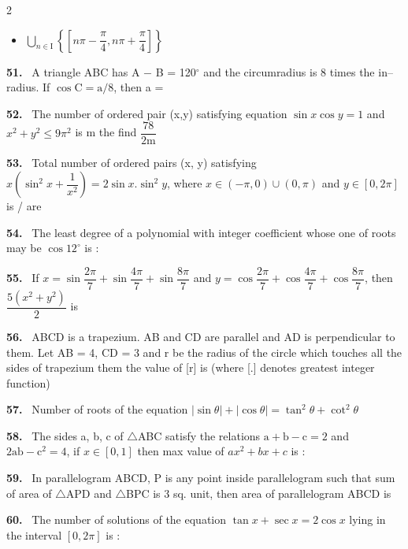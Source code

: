 \documentclass[10pt]{extarticle}
\newcommand{\qn}[1]{\par\smallskip\noindent\textbf{#1.}~}
\newenvironment{qoptions}{\begin{itemize}[leftmargin=1.8em,itemsep=1pt,topsep=2pt,label={}]}{\end{itemize}}
\newcommand{\opt}[2]{\item[(#1)] #2}
\begin{document}
\begin{multicols}{2}
\begin{qoptions}
\opt{D}{$\displaystyle\bigcup_{n\in\mathrm I}\left\{\left[n\pi-\dfrac\pi4,n\pi+\dfrac\pi4\right]\right\}$}
\end{qoptions}
\qn{51} A triangle ABC has A $-$ B = 120$^\circ$ and the circumradius is 8 times the in--radius. If $\cos\mathrm C=\mathrm a/8$, then a =
\qn{52} The number of ordered pair (x,y) satisfying equation $\sin x\cos y=1$ and $x^2+y^2\le9\pi^2$ is m the find $\dfrac{78}{2\mathrm m}$
\qn{53} Total number of ordered pairs (x, y) satisfying $x\left(\sin^2x+\dfrac1{x^2}\right)=2\sin x.\sin^2y$, where $x\in(-\pi,0)\cup(0,\pi)$ and $y\in[0,2\pi]$ is / are
\qn{54} The least degree of a polynomial with integer coefficient whose one of roots may be $\cos12^\circ$ is :
\qn{55} If $x=\sin\dfrac{2\pi}7+\sin\dfrac{4\pi}7+\sin\dfrac{8\pi}7$ and $y=\cos\dfrac{2\pi}7+\cos\dfrac{4\pi}7+\cos\dfrac{8\pi}7$, then $\dfrac{5(x^2+y^2)}2$ is
\qn{56} ABCD is a trapezium. AB and CD are parallel and AD is perpendicular to them. Let AB = 4, CD = 3 and r be the radius of the circle which touches all the sides of trapezium them the value of [r] is (where [.] denotes greatest integer function)
\qn{57} Number of roots of the equation $|\sin\theta|+|\cos\theta|=\tan^2\theta+\cot^2\theta$
\qn{58} The sides a, b, c of $\triangle$ABC satisfy the relations $\mathrm a+\mathrm b-\mathrm c=2$ and $2\mathrm{ab}-\mathrm c^2=4$, if $x\in[0,1]$ then max value of $ax^2+bx+c$ is :
\qn{59} In parallelogram ABCD, P is any point inside parallelogram such that sum of area of $\triangle$APD and $\triangle$BPC is 3 sq. unit, then area of parallelogram ABCD is
\qn{60} The number of solutions of the equation $\tan x+\sec x=2\cos x$ lying in the interval $[0,2\pi]$ is :
\end{multicols}
\end{document}
